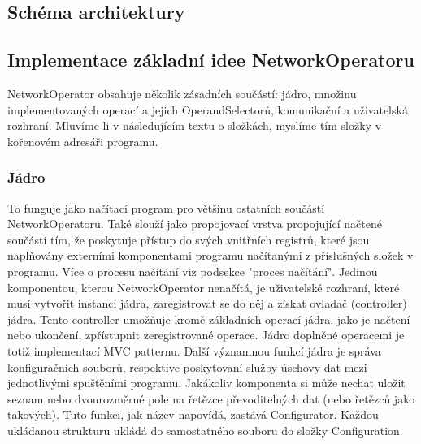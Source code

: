 \documentclass[12pt]{article}
\newcommand\nodegui{NetworkOperatorGUI}
\newcommand\nodeui{IUserInterface}
\newcommand\nodepm{PluginManager}
\newcommand\nodeconf{Configurator}
\newcommand\nodeo{NetworkOperator}
\newcommand\nodeoc{ActionRequestCreator}
\newcommand\nodeop{ActionRequestProcessor}
\newcommand\nodeci{ICommunicationInterface}
\newcommand\nodeos{OperandSelector}
\newcommand\nodenm{NetworkCommunicator}
\newcommand\nodeml{MouseShrARC}
\newcommand\nodekl{KeyboardShrARC}
\newcommand\nodems{MouseShrARP}
\newcommand\nodeks{KeyboardShrARP}
\newcommand\nodeses{ScreenEdgeSelector}
\begin{document}
\subsection{Schéma architektury}
\begin{center}
\end{center}

\subsection{Implementace základní idee NetworkOperatoru}
NetworkOperator obsahuje několik zásadních součástí: jádro, množinu implementovaných operací a jejich OperandSelectorů, komunikační a uživatelská rozhraní. Mluvíme-li v následujícím textu o složkách, myslíme tím složky v kořenovém adresáři programu.

\subsubsection{Jádro}
To funguje jako načítací program pro většinu ostatních součástí NetworkOperatoru. Také slouží jako propojovací vrstva propojující načtené součástí tím, že poskytuje přístup do svých vnitřních registrů, které jsou naplňovány externími komponentami programu načítanými z příslušných složek v programu. Více o procesu načítání viz podsekce "proces načítání".
Jedinou komponentou, kterou NetworkOperator nenačítá, je uživatelské rozhraní, které musí vytvořit instanci jádra, zaregistrovat se do něj a získat ovladač (controller) jádra. Tento controller umožňuje kromě základních operací jádra, jako je načtení nebo ukončení, zpřístupnit zeregistrované operace. Jádro doplněné operacemi je totiž implementací MVC patternu.
Další významnou funkcí jádra je správa konfiguračních souborů, respektive poskytovaní služby úschovy dat mezi jednotlivými spuštěními programu. Jakákoliv komponenta si může nechat uložit seznam nebo dvourozměrné pole na řetězce převoditelných dat (nebo řetězců jako takových). Tuto funkci, jak název napovídá, zastává Configurator. Každou ukládanou strukturu ukládá do samostatného souboru do složky Configuration.
\end{document}

